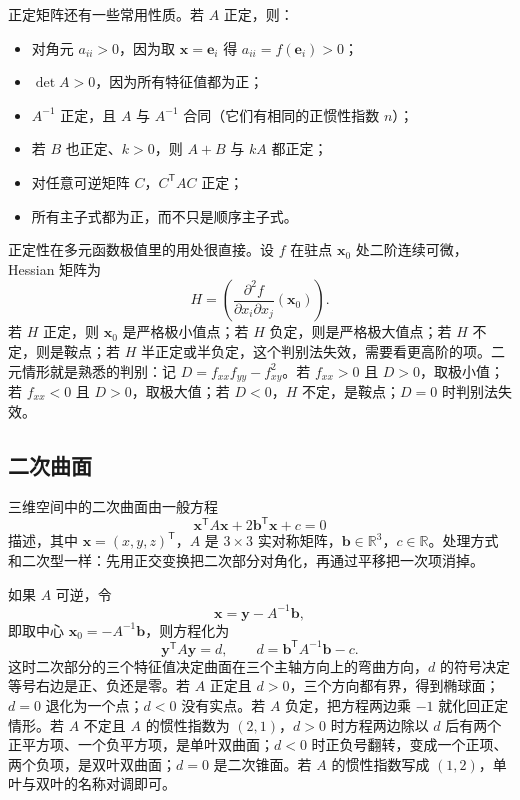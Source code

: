正定矩阵还有一些常用性质。若 $A$ 正定，则：
\begin{itemize}
\item 对角元 $a_{ii}>0$，因为取 $\mathbf{x}=\mathbf{e}_i$ 得 $a_{ii}=f(\mathbf{e}_i)>0$；
\item $\det A>0$，因为所有特征值都为正；
\item $A^{-1}$ 正定，且 $A$ 与 $A^{-1}$ 合同（它们有相同的正惯性指数 $n$）；
\item 若 $B$ 也正定、$k>0$，则 $A+B$ 与 $kA$ 都正定；
\item 对任意可逆矩阵 $C$，$C^{\mathsf T}AC$ 正定；
\item 所有主子式都为正，而不只是顺序主子式。
\end{itemize}

正定性在多元函数极值里的用处很直接。设 $f$ 在驻点 $\mathbf{x}_0$ 处二阶连续可微，Hessian 矩阵为
\[
H=\left(\frac{\partial^2f}{\partial x_i\partial x_j}(\mathbf{x}_0)\right).
\]
若 $H$ 正定，则 $\mathbf{x}_0$ 是严格极小值点；若 $H$ 负定，则是严格极大值点；若 $H$ 不定，则是鞍点；若 $H$ 半正定或半负定，这个判别法失效，需要看更高阶的项。二元情形就是熟悉的判别：记 $D=f_{xx}f_{yy}-f_{xy}^2$。若 $f_{xx}>0$ 且 $D>0$，取极小值；若 $f_{xx}<0$ 且 $D>0$，取极大值；若 $D<0$，$H$ 不定，是鞍点；$D=0$ 时判别法失效。

\subsection{二次曲面}

三维空间中的二次曲面由一般方程
\[
\mathbf{x}^{\mathsf T}A\mathbf{x}+2\mathbf{b}^{\mathsf T}\mathbf{x}+c=0
\]
描述，其中 $\mathbf{x}=(x,y,z)^{\mathsf T}$，$A$ 是 $3\times3$ 实对称矩阵，$\mathbf{b}\in\mathbb R^3$，$c\in\mathbb R$。处理方式和二次型一样：先用正交变换把二次部分对角化，再通过平移把一次项消掉。

如果 $A$ 可逆，令
\[
\mathbf{x}=\mathbf{y}-A^{-1}\mathbf{b},
\]
即取中心 $\mathbf{x}_0=-A^{-1}\mathbf{b}$，则方程化为
\[
\mathbf{y}^{\mathsf T}A\mathbf{y}=d,\qquad d=\mathbf{b}^{\mathsf T}A^{-1}\mathbf{b}-c.
\]
这时二次部分的三个特征值决定曲面在三个主轴方向上的弯曲方向，$d$ 的符号决定等号右边是正、负还是零。若 $A$ 正定且 $d>0$，三个方向都有界，得到椭球面；$d=0$ 退化为一个点；$d<0$ 没有实点。若 $A$ 负定，把方程两边乘 $-1$ 就化回正定情形。若 $A$ 不定且 $A$ 的惯性指数为 $(2,1)$，$d>0$ 时方程两边除以 $d$ 后有两个正平方项、一个负平方项，是单叶双曲面；$d<0$ 时正负号翻转，变成一个正项、两个负项，是双叶双曲面；$d=0$ 是二次锥面。若 $A$ 的惯性指数写成 $(1,2)$，单叶与双叶的名称对调即可。

